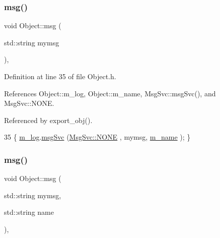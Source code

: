 \mbox{\label{classObject_a58b2d0618c2d08cf2383012611528d97}} 
\subsubsection{\texorpdfstring{msg()}{msg()}\hspace{0.1cm}{\footnotesize\ttfamily [1/2]}}
{\footnotesize\ttfamily void Object\+::msg (\begin{DoxyParamCaption}\item[{std\+::string}]{mymsg }\end{DoxyParamCaption})\hspace{0.3cm}{\ttfamily [inline]}, {\ttfamily [inherited]}}



Definition at line 35 of file Object.\+h.



References Object\+::m\+\_\+log, Object\+::m\+\_\+name, Msg\+Svc\+::msg\+Svc(), and Msg\+Svc\+::\+N\+O\+NE.



Referenced by export\+\_\+obj().


\begin{DoxyCode}
35 \{ \hyperlink{classObject_a0d269813dd7ac1f24bc143031e2963f2}{m\_log}.\hyperlink{classMsgSvc_ad25f18047920cc59a314e5098259711c}{msgSvc} (\hyperlink{classMsgSvc_ae671eb7301996cd049d2da8a65925926a9be9ae32fed8e1e6eba4a58692210fbd}{MsgSvc::NONE}    , mymsg, \hyperlink{classObject_a8b83c95c705d2c3ba0d081fe1710f48d}{m\_name} ); \}
\end{DoxyCode}
\mbox{\label{classObject_ac5d59299273cee27aacf7de00d2e7034}} 
\subsubsection{\texorpdfstring{msg()}{msg()}\hspace{0.1cm}{\footnotesize\ttfamily [2/2]}}
{\footnotesize\ttfamily void Object\+::msg (\begin{DoxyParamCaption}\item[{std\+::string}]{mymsg,  }\item[{std\+::string}]{name }\end{DoxyParamCaption})\hspace{0.3cm}{\ttfamily [inline]}, {\ttfamily [inherited]}}



